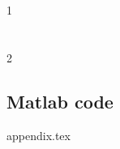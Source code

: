 \documentclass[oneside]{article}
\begin{document}
	\tableofcontents

	\section{}
		{1}
	\section{}
		{2}
	
	

	\begin{appendices}
		\section{Matlab code}
		{appendix.tex}
	\end{appendices}
\end{document}
